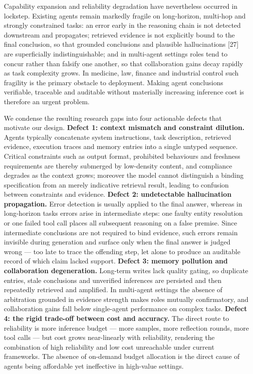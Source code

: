 \documentclass[journal,10pt,a4paper]{IEEEtran}
\begin{document}
Capability expansion and reliability degradation have nevertheless occurred in lockstep. Existing agents remain markedly fragile on long-horizon, multi-hop and strongly constrained tasks: an error early in the reasoning chain is not detected downstream and propagates; retrieved evidence is not explicitly bound to the final conclusion, so that grounded conclusions and plausible hallucinations [27] are superficially indistinguishable; and in multi-agent settings roles tend to concur rather than falsify one another, so that collaboration gains decay rapidly as task complexity grows. In medicine, law, finance and industrial control such fragility is the primary obstacle to deployment. Making agent conclusions verifiable, traceable and auditable without materially increasing inference cost is therefore an urgent problem.

We condense the resulting research gaps into four actionable defects that motivate our design. \textbf{Defect 1: context mismatch and constraint dilution.} Agents typically concatenate system instructions, task description, retrieved evidence, execution traces and memory entries into a single untyped sequence. Critical constraints such as output format, prohibited behaviours and freshness requirements are thereby submerged by low-density content, and compliance degrades as the context grows; moreover the model cannot distinguish a binding specification from an merely indicative retrieval result, leading to confusion between constraints and evidence. \textbf{Defect 2: undetectable hallucination propagation.} Error detection is usually applied to the final answer, whereas in long-horizon tasks errors arise in intermediate steps: one faulty entity resolution or one failed tool call places all subsequent reasoning on a false premise. Since intermediate conclusions are not required to bind evidence, such errors remain invisible during generation and surface only when the final answer is judged wrong --- too late to trace the offending step, let alone to produce an auditable record of which claim lacked support. \textbf{Defect 3: memory pollution and collaboration degeneration.} Long-term writes lack quality gating, so duplicate entries, stale conclusions and unverified inferences are persisted and then repeatedly retrieved and amplified. In multi-agent settings the absence of arbitration grounded in evidence strength makes roles mutually confirmatory, and collaboration gains fall below single-agent performance on complex tasks. \textbf{Defect 4: the rigid trade-off between cost and accuracy.} The direct route to reliability is more inference budget --- more samples, more reflection rounds, more tool calls --- but cost grows near-linearly with reliability, rendering the combination of high reliability and low cost unreachable under current frameworks. The absence of on-demand budget allocation is the direct cause of agents being affordable yet ineffective in high-value settings.
\end{document}
